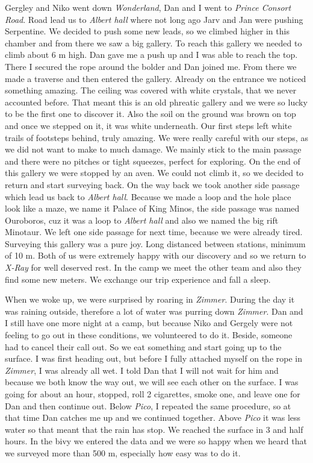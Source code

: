 Gergley and Niko went down \emph{Wonderland}, Dan and I went to
\emph{Prince Consort Road}. Road lead us to \emph{Albert hall} where not
long ago Jarv and Jan were pushing Serpentine. We decided to push some
new leads, so we climbed higher in this chamber and from there we saw a
big gallery. To reach this gallery we needed to climb about 6 m high.
Dan gave me a push up and I was able to reach the top. There I secured
the rope around the bolder and Dan joined me. From there we made a
traverse and then entered the gallery. Already on the entrance we
noticed something amazing. The ceiling was covered with white crystals,
that we never accounted before. That meant this is an old phreatic
gallery and we were so lucky to be the first one to discover it. Also
the soil on the ground was brown on top and once we stepped on it, it
was white underneath. Our first steps left white trails of footsteps
behind, truly amazing. We were really careful with our steps, as we did
not want to make to much damage. We mainly stick to the main passage and
there were no pitches or tight squeezes, perfect for exploring. On the
end of this gallery we were stopped by an aven. We could not climb it,
so we decided to return and start surveying back. On the way back we
took another side passage which lead us back to \emph{Albert hall}.
Because we made a loop and the hole place look like a maze, we name it
Palace of King Minos, the side passage was named Ouroboros, cuz it was a
loop to \emph{Albert hall} and also we named the big rift Minotaur. We
left one side passage for next time, because we were already tired.
Surveying this gallery was a pure joy. Long distanced between stations,
minimum of 10 m. Both of us were extremely happy with our discovery and
so we return to \emph{X-Ray} for well deserved rest. In the camp we meet
the other team and also they find some new meters. We exchange our trip
experience and fall a sleep.

When we woke up, we were surprised by roaring in \emph{Zimmer}. During
the day it was raining outside, therefore a lot of water was purring
down \emph{Zimmer}. Dan and I still have one more night at a camp, but
because Niko and Gergely were not feeling to go out in these conditions,
we volunteered to do it. Beside, someone had to cancel their call out.
So we eat something and start going up to the surface. I was first
heading out, but before I fully attached myself on the rope in
\emph{Zimmer}, I was already all wet. I told Dan that I will not wait
for him and because we both know the way out, we will see each other on
the surface. I was going for about an hour, stopped, roll 2 cigarettes,
smoke one, and leave one for Dan and then continue out. Below
\emph{Pico}, I repeated the same procedure, so at that time Dan catches
me up and we continued together. Above \emph{Pico} it was less water so
that meant that the rain has stop. We reached the surface in 3 and half
hours. In the bivy we entered the data and we were so happy when we
heard that we surveyed more than 500 m, especially how easy was to do
it.

